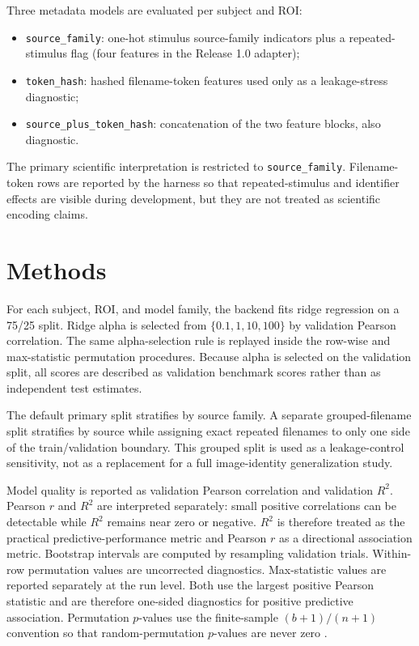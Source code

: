 \documentclass[11pt]{article}
\newcommand{\rsq}{$R^2$}
\begin{document}
Three metadata models are evaluated per subject and ROI:

\begin{itemize}
  \item \texttt{source\_family}: one-hot stimulus source-family indicators
  plus a repeated-stimulus flag (four features in the Release 1.0 adapter);
  \item \texttt{token\_hash}: hashed filename-token features used only as a
  leakage-stress diagnostic;
  \item \texttt{source\_plus\_token\_hash}: concatenation of the two feature
  blocks, also diagnostic.
\end{itemize}

The primary scientific interpretation is restricted to \texttt{source\_family}.
Filename-token rows are reported by the harness so that repeated-stimulus and
identifier effects are visible during development, but they are not treated as
scientific encoding claims.

\section{Methods}

For each subject, ROI, and model family, the backend fits ridge regression
\cite{hoerl1970ridge} on a 75/25 split. Ridge alpha is selected from
$\{0.1, 1, 10, 100\}$ by validation Pearson correlation. The same
alpha-selection rule is replayed inside the row-wise and max-statistic
permutation procedures. Because alpha is selected on the validation split, all
scores are described as validation benchmark scores rather than as independent
test estimates.

The default primary split stratifies by source family. A separate
grouped-filename split stratifies by source while assigning exact repeated
filenames to only one side of the train/validation boundary. This grouped split
is used as a leakage-control sensitivity, not as a replacement for a full
image-identity generalization study.

Model quality is reported as validation Pearson correlation and validation
\rsq{}. Pearson $r$ and \rsq{} are interpreted separately: small positive
correlations can be detectable while \rsq{} remains near zero or negative.
\rsq{} is therefore treated as the practical predictive-performance metric and
Pearson $r$ as a directional association metric. Bootstrap intervals are
computed by resampling validation trials. Within-row permutation values are
uncorrected diagnostics. Max-statistic values are reported separately at the run
level. Both use the largest positive Pearson statistic and are therefore
one-sided diagnostics for positive predictive association. Permutation
$p$-values use the finite-sample $(b+1)/(n+1)$ convention so that
random-permutation $p$-values are never zero \cite{phipson2010permutation}.
\end{document}
